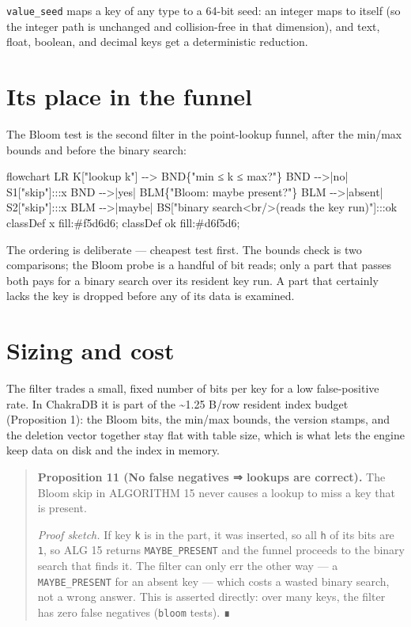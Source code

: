 \documentclass[
  11pt,
  openany]{book}
\newenvironment{Shaded}{}{}
\newcommand{\NormalTok}[1]{#1}
\begin{document}
\texttt{value\_seed} maps a key of any type to a 64-bit seed: an integer
maps to itself (so the integer path is unchanged and collision-free in
that dimension), and text, float, boolean, and decimal keys get a
deterministic reduction.

\section{Its place in the funnel}\label{its-place-in-the-funnel}

The Bloom test is the second filter in the point-lookup funnel, after
the min/max bounds and before the binary search:

\begin{Shaded}
\begin{Highlighting}[]
\NormalTok{flowchart LR}
\NormalTok{    K["lookup k"] {-}{-}\textgreater{} BND\{"min ≤ k ≤ max?"\}}
\NormalTok{    BND {-}{-}\textgreater{}|no| S1["skip"]:::x}
\NormalTok{    BND {-}{-}\textgreater{}|yes| BLM\{"Bloom: maybe present?"\}}
\NormalTok{    BLM {-}{-}\textgreater{}|absent| S2["skip"]:::x}
\NormalTok{    BLM {-}{-}\textgreater{}|maybe| BS["binary search\textless{}br/\textgreater{}(reads the key run)"]:::ok}
\NormalTok{    classDef x fill:\#f5d6d6; classDef ok fill:\#d6f5d6;}
\end{Highlighting}
\end{Shaded}

The ordering is deliberate --- cheapest test first. The bounds check is
two comparisons; the Bloom probe is a handful of bit reads; only a part
that passes both pays for a binary search over its resident key run. A
part that certainly lacks the key is dropped before any of its data is
examined.

\section{Sizing and cost}\label{sizing-and-cost}

The filter trades a small, fixed number of bits per key for a low
false-positive rate. In ChakraDB it is part of the \textasciitilde1.25
B/row resident index budget (Proposition 1): the Bloom bits, the min/max
bounds, the version stamps, and the deletion vector together stay flat
with table size, which is what lets the engine keep data on disk and the
index in memory.

\begin{quote}
\textbf{Proposition 11 (No false negatives ⇒ lookups are correct).} The
Bloom skip in ALGORITHM 15 never causes a lookup to miss a key that is
present.

\emph{Proof sketch.} If key \texttt{k} is in the part, it was inserted,
so all \texttt{h} of its bits are \texttt{1}, so ALG 15 returns
\texttt{MAYBE\_PRESENT} and the funnel proceeds to the binary search
that finds it. The filter can only err the other way --- a
\texttt{MAYBE\_PRESENT} for an absent key --- which costs a wasted
binary search, not a wrong answer. This is asserted directly: over many
keys, the filter has zero false negatives (\texttt{bloom} tests). ∎
\end{quote}
\end{document}
